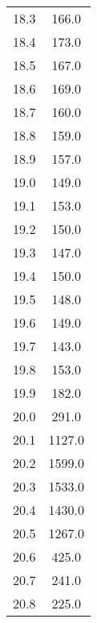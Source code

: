 \begin{table}
{\begin{tabular}{S S}
        18.3 & 166.0 \\
        18.4 & 173.0 \\
        18.5 & 167.0 \\
        18.6 & 169.0 \\
        18.7 & 160.0 \\
        18.8 & 159.0 \\
        18.9 & 157.0 \\
        19.0 & 149.0 \\
        19.1 & 153.0 \\
        19.2 & 150.0 \\
        19.3 & 147.0 \\
        19.4 & 150.0 \\
        19.5 & 148.0 \\
        19.6 & 149.0 \\
        19.7 & 143.0 \\
        19.8 & 153.0 \\
        19.9 & 182.0 \\
        20.0 & 291.0 \\
        20.1 & 1127.0 \\
        20.2 & 1599.0 \\
        20.3 & 1533.0 \\
        20.4 & 1430.0 \\
        20.5 & 1267.0 \\
        20.6 & 425.0 \\
        20.7 & 241.0 \\
        20.8 & 225.0 \\
        \bottomrule
    \end{tabular}
    }
\end{table}
